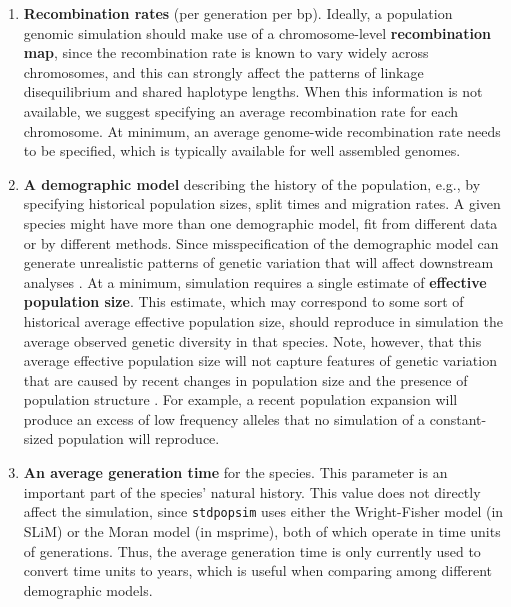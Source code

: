 \documentclass[hidelinks]{article}
\newcommand{\stdpopsim}{\texttt{stdpopsim}\xspace}
\begin{document}
\begin{enumerate}
\item
  \textbf{Recombination rates} (per generation per bp).
  Ideally, a population genomic simulation should make use of a chromosome-level \textbf{recombination map}, since the recombination rate is known to vary widely across chromosomes,
  and this can strongly affect the patterns of linkage disequilibrium and shared haplotype lengths.
  When this information is not available, we suggest specifying an average recombination rate for each chromosome.
  At minimum, an average genome-wide recombination rate needs to be specified, which is typically available for well assembled genomes.

\item
  \textbf{A demographic model} describing the history of the population,
  e.g., by specifying historical population sizes, split times and migration rates.
  A given species might have more than one demographic model, fit from different data or by different methods.
  Since misspecification of the demographic model can generate unrealistic patterns of genetic variation that will affect downstream analyses \citep[e.g.,][]{Navascues2009}.
  At a minimum, simulation requires a single estimate of \textbf{effective population size}. This estimate, which may correspond to some sort of historical average effective population size,
  should reproduce in simulation the average observed genetic diversity in that species. Note, however, that this average effective population size will not capture features of genetic variation that are caused by recent changes in population size and the presence of population structure \citep{MacLeod2013}.
  For example, a recent population expansion will produce
  an excess of low frequency alleles that no simulation of a constant-sized
  population will reproduce.

\item
  \textbf{An average generation time} for the species.
  This parameter is an important part of the species' natural history.
  This value does not directly affect the simulation, since
  \stdpopsim uses either the Wright-Fisher model (in SLiM) or the Moran model (in msprime),
  both of which operate in time units of generations. 
  Thus, the average generation time is only currently used to convert time units to years, 
  which is useful when comparing among different demographic models.

\end{enumerate}
\end{document}
